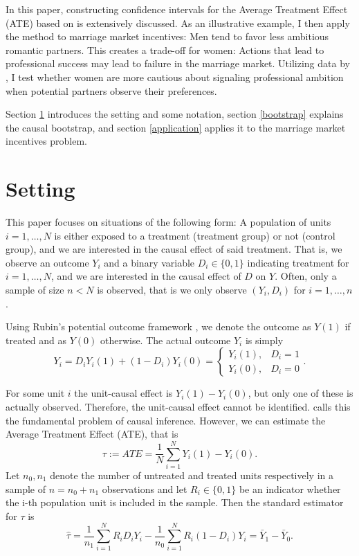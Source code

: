 \documentclass[aodsor,preprint]{imsart}
\numberwithin{equation}{section}
\theoremstyle{plain}
\begin{document}
In this paper, constructing confidence intervals for the Average Treatment Effect (ATE) based on \cite{Imbens_2021} is extensively discussed. As an illustrative example, I then apply the method to marriage market incentives: Men tend to favor less ambitious romantic partners. This creates a trade-off for women: Actions that lead to professional success may lead to failure in the marriage market. Utilizing data by \cite{Bursztyn_2017}, I test whether women are more cautious about signaling professional ambition when potential partners observe their preferences.

Section \ref{setting} introduces the setting and some notation, section \ref{bootstrap} explains the causal bootstrap, and section \ref{application} applies it to the marriage market incentives problem.



\section{Setting} \label{setting}

This paper focuses on situations of the following form: A population of units $i = 1,\ldots, N$ is either exposed to a treatment (treatment group) or not (control group), and we are interested in the causal effect of said treatment. That is, we observe an outcome $Y_i$ and a binary variable $D_i \in \{0, 1\}$ indicating treatment for $i = 1,\ldots, N$, and we are interested in the causal effect of $D$ on $Y$. Often, only a sample of size $n < N$ is observed, that is we only observe $(Y_i, D_i)$ for $i = 1,\ldots, n$.

Using Rubin's potential outcome framework \citep{Rubin_2005}, we denote the outcome as $Y(1)$ if treated and as $Y(0)$ otherwise. The actual outcome $Y_i$ is simply
$$
Y_i = D_i Y_i(1) + (1-D_i) Y_i(0) = \begin{cases}
	Y_i(1), & D_i = 1 \\
	Y_i(0), & D_i = 0
\end{cases}.
$$

For some unit $i$ the unit-causal effect is $Y_i(1) - Y_i(0)$, but only one of these is actually observed. Therefore, the unit-causal effect cannot be identified. \cite{Holland_1986} calls this the fundamental problem of causal inference. However, we can estimate the Average Treatment Effect (ATE), that is
$$
\tau := ATE = \frac{1}{N} \sum_{i = 1}^{N} Y_i(1) - Y_i(0).
$$
Let $n_0, n_1$ denote the number of untreated and treated units respectively in a sample of $n = n_0 + n_1$ observations and let $R_i \in \{0, 1\}$ be an indicator whether the i-th population unit is included in the sample. Then the standard estimator for $\tau$ is
$$
\widehat{\tau} = \frac{1}{n_1} \sum_{i = 1}^{N} R_i D_i Y_i - \frac{1}{n_0} \sum_{i = 1}^{N} R_i (1 - D_i) Y_i = \bar{Y}_1 - \bar{Y}_0.
$$
\end{document}
